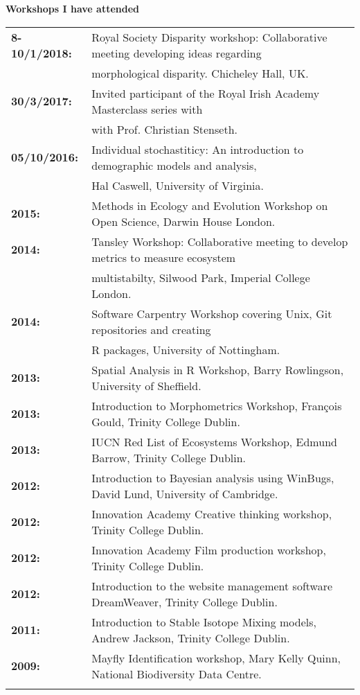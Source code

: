 \documentclass[10pt,a4paper]{article}
\begin{document}
\begin{flushleft}
\raggedright\textbf{Workshops I have attended}\\
\begin{tabular}{ll}
\textbf{8-10/1/2018:} & Royal Society Disparity workshop: Collaborative meeting developing ideas regarding\\ 
&morphological disparity. Chicheley Hall, UK.\\
\textbf{30/3/2017:} & Invited participant of the Royal Irish Academy Masterclass series with\\
& with Prof. Christian Stenseth.\\
\textbf{05/10/2016:} & Individual stochastiticy: An introduction to demographic models and analysis,\\ 
&Hal Caswell, University of Virginia.\\
\textbf{2015:} & Methods in Ecology and Evolution Workshop on Open Science, Darwin House London.\\
\textbf{2014:} & Tansley Workshop: Collaborative meeting to develop metrics to measure ecosystem\\
&multistabilty, Silwood Park, Imperial College London.\\
\textbf{2014:} & Software Carpentry Workshop covering Unix, Git repositories and creating\\
&R packages, University of Nottingham.\\
\textbf{2013:} & Spatial Analysis in R Workshop, Barry Rowlingson, University of Sheffield.\\
\textbf{2013:} & Introduction to Morphometrics Workshop, François Gould, Trinity College Dublin.\\
\textbf{2013:} & IUCN Red List of Ecosystems Workshop, Edmund Barrow, Trinity College Dublin.\\
\textbf{2012:} & Introduction to Bayesian analysis using WinBugs, David Lund, University of Cambridge.\\
\textbf{2012:} & Innovation Academy Creative thinking workshop, Trinity College Dublin.\\
\textbf{2012:} & Innovation Academy Film production workshop, Trinity College Dublin.\\
\textbf{2012:} & Introduction to the website management software DreamWeaver, Trinity College Dublin.\\
\textbf{2011:} & Introduction to Stable Isotope Mixing models, Andrew Jackson, Trinity College Dublin.\\
\textbf{2009:} & Mayfly Identification workshop, Mary Kelly Quinn, National Biodiversity Data Centre.\\
&\\
\end{tabular}





\end{flushleft}
\end{document}
